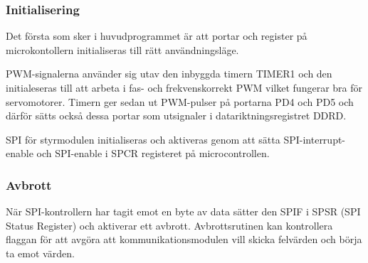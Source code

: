 \documentclass[tekniskrapport/tech.tex]{subfiles}
\begin{document}
\subsubsection{Initialisering}
Det första som sker i huvudprogrammet är att portar och register på
microkontollern initialiseras till rätt användningsläge.

PWM-signalerna använder sig utav den inbyggda timern TIMER1 och den
initialeseras till att arbeta i fas- och frekvenskorrekt PWM vilket fungerar
bra för servomotorer. Timern ger sedan ut PWM-pulser på portarna PD4 och PD5
och därför sätts också dessa portar som utsignaler i datariktningsregistret
DDRD. 

SPI för styrmodulen initialiseras och aktiveras genom att sätta
SPI-interrupt-enable och SPI-enable i SPCR registeret på microcontrollen.

\subsubsection{Avbrott} \label{sec:ctrl-int}
När SPI-kontrollern har tagit emot en byte av data sätter den SPIF i SPSR (SPI
Status Register) och aktiverar ett avbrott. Avbrottsrutinen kan kontrollera
flaggan för att avgöra att kommunikationsmodulen vill skicka felvärden och
börja ta emot värden.
\end{document}
